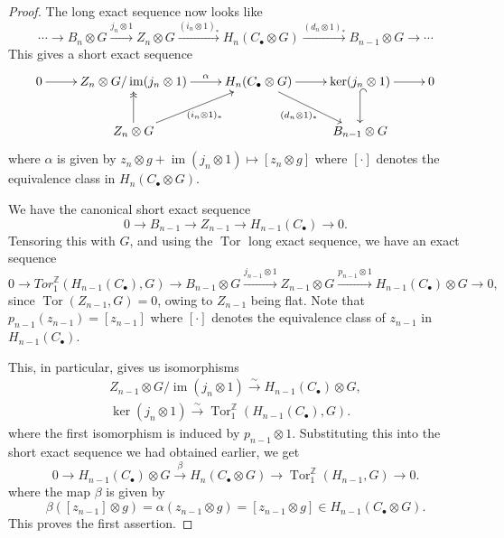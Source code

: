 \documentclass[10pt]{article}
\theoremstyle{thmstyle}
\theoremstyle{defstyle}
\newcommand{\Z}{\mathbb{Z}}
\newcommand{\im}{\operatorname{im}}
\newcommand{\Tor}{\operatorname{Tor}}
\begin{document}
\begin{proof}
    The long exact sequence now looks like
    \begin{equation*}
        \cdots\rightarrow B_n\otimes G\xrightarrow{j_n\otimes 1} Z_n\otimes G\xrightarrow{(i_n\otimes 1)_\ast} H_n(C_\bullet\otimes G)\xrightarrow{(d_n\otimes 1)_\ast} B_{n - 1}\otimes G\rightarrow\cdots
    \end{equation*}
    This gives a short exact sequence 
    \begin{equation*}
    \xymatrix{
    0\ar[r] & Z_n\otimes G/\im(j_n\otimes 1)\ar[r]^-\alpha & H_n(C_\bullet\otimes G)\ar[r]\ar[rd]_-{(d_n\otimes 1)_\ast} & \ker(j_n\otimes 1)\ar[r]\ar@{^{(}->}[d] & 0\\
    & Z_{n}\otimes G\ar@{->>}[u]\ar[ru]_{(i_n\otimes 1)_\ast} & & B_{n - 1}\otimes G & 
    }
    \end{equation*}
    where $\alpha$ is given by $z_n\otimes g + \im(j_n\otimes 1)\mapsto [z_n\otimes g]$ where $[\cdot]$ denotes the equivalence class in $H_n(C_\bullet\otimes G)$.

    We have the canonical short exact sequence 
    \begin{equation*}
        0\to B_{n - 1}\to Z_{n - 1}\to H_{n - 1}(C_\bullet)\to 0.
    \end{equation*}
    Tensoring this with $G$, and using the $\Tor$ long exact sequence, we have an exact sequence
    \begin{equation*}
        0\to Tor^\Z_1(H_{n - 1}(C_\bullet), G)\to B_{n - 1}\otimes G\xrightarrow{j_{n - 1}\otimes 1} Z_{n - 1}\otimes G\xrightarrow{p_{n - 1}\otimes 1} H_{n - 1}(C_\bullet)\otimes G\to 0,
    \end{equation*}
    since $\Tor(Z_{n - 1}, G) = 0$, owing to $Z_{n - 1}$ being flat. Note that $p_{n - 1}(z_{n - 1}) = [z_{n - 1}]$ where $[\cdot]$ denotes the equivalence class of $z_{n - 1}$ in $H_{n - 1}(C_\bullet)$.

    This, in particular, gives us isomorphisms
    \begin{align*}
        Z_{n - 1}\otimes G/\im(j_n\otimes 1)\stackrel{\sim}{\longrightarrow} H_{n - 1}(C_\bullet)\otimes G,\\
        \ker(j_n\otimes 1)\stackrel{\sim}{\longrightarrow} \Tor^\Z_1(H_{n - 1}(C_\bullet), G).
    \end{align*}
    where the first isomorphism is induced by $p_{n - 1}\otimes 1$. Substituting this into the short exact sequence we had obtained earlier, we get 
    \begin{equation*}
        0\to H_{n - 1}(C_\bullet)\otimes G\xrightarrow{\beta} H_n(C_\bullet\otimes G)\to\Tor^\Z_1(H_{n - 1}, G)\to 0.
    \end{equation*}
    where the map $\beta$ is given by 
    \begin{equation*}
        \beta([z_{n - 1}]\otimes g) = \alpha\left(z_{n - 1}\otimes g\right) = [z_{n - 1}\otimes g]\in H_{n - 1}(C_\bullet\otimes G).
    \end{equation*}
    This proves the first assertion. 
\end{proof}
\end{document}
